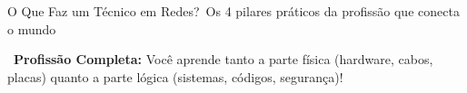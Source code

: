 \begin{frame}{O Que Faz um Técnico em Redes?}{\faUserAstronaut\ Os 4 pilares práticos da profissão que conecta o mundo}
  \vspace{0.1cm}
  \begin{statcard}
    \tiny \textcolor{TechDark}{\faWrench\ \textbf{Profissão Completa:} Você aprende tanto a parte física (hardware, cabos, placas) quanto a parte lógica (sistemas, códigos, segurança)!}
  \end{statcard}
\end{frame}
